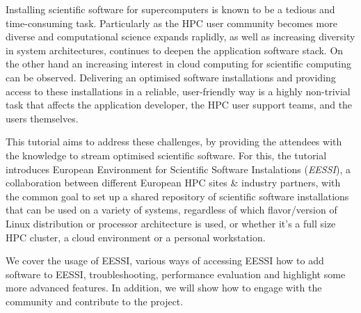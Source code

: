 Installing scientific software for supercomputers is known to be a tedious and time-consuming task. Particularly as the 
HPC user community becomes more diverse and computational science expands raplidly, as well as increasing diversity in 
system architectures, continues to deepen the application software stack. On the other hand an increasing interest in 
cloud computing for scientific computing can be observed. Delivering an optimised software installations and providing 
access to these installations in a reliable, user-friendly way is a highly non-trivial task that affects the application 
developer, the HPC user support teams, and the users themselves.

This tutorial aims to address these challenges, by providing the attendees with the knowledge to stream optimised scientific 
software. For this, the tutorial introduces European Environment for Scientific Software Instalations (\emph{EESSI}), a 
collaboration between different European HPC sites \& industry partners, with the common goal to set up a shared 
repository of scientific software installations that can be used on a variety of systems, regardless of which 
flavor/version of Linux distribution or processor architecture is used, or whether it’s a full size HPC cluster, a cloud 
environment or a personal workstation.

We cover the usage of EESSI, various ways of accessing EESSI how to add software to EESSI, troubleshooting, performance 
evaluation  and highlight some more advanced features. In addition, we will show how to engage with the community and 
contribute to the project.
